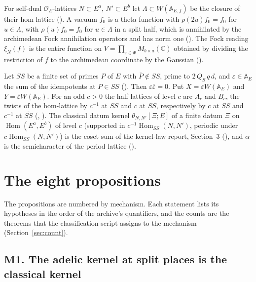 \documentclass[11pt]{article}
\newcommand{\OEr}{\mathcal O_E}
\newcommand{\A}{\mathbb A}
\newcommand{\Hom}{\operatorname{Hom}}
\theoremstyle{remark}
\begin{document}
For self-dual $\OEr$-lattices $N\subset E^a$, $N'\subset E^b$ let $\Lambda\subset W(\A_{E,f})$ be the closure of their hom-lattice (). A vacuum $f_0$ is a theta function with $\rho(2u)f_0=f_0$ for $u\in\Lambda$, with $\rho(u)f_0=f_0$ for $u\in\Lambda$ in a split half, which is annihilated by the archimedean Fock annihilation operators and has norm one (). The Fock reading $\xi_N(f)$ is the entire function on $V=\prod_{\tau\in\Phi}M_{b\times a}(\mathbb C)$ obtained by dividing the restriction of $f$ to the archimedean coordinate by the Gaussian ().

Let $SS$ be a finite set of primes $P$ of $E$ with $\bar P\notin SS$, prime to $2\,Q_S\,q\,d$, and $\varepsilon\in\A_E$ the sum of the idempotents at $P\in SS$ (). Then $\varepsilon\bar\varepsilon=0$. Put $X=\varepsilon W(\A_E)$ and $Y=\bar\varepsilon W(\A_E)$. For an odd $c>0$ the half lattices of level $c$ are $A_c$ and $B_c$, the twists of the hom-lattice by $c^{-1}$ at $SS$ and $c$ at $\overline{SS}$, respectively by $c$ at $SS$ and $c^{-1}$ at $\overline{SS}$ (, ). The classical datum kernel $\theta_{N,N'}[\Xi;E]$ of a finite datum $\Xi$ on $\Hom(E^a,E^b)$ of level $c$ (supported in $c^{-1}\Hom_{SS}(N,N')$, periodic under $c\Hom_{SS}(N,N')$) is the coset sum of the kernel-law report, Section~3 (), and $\alpha$ is the semicharacter of the period lattice ().

\section{The eight propositions}\label{sec:props}

The propositions are numbered by mechanism. Each statement lists its hypotheses in the order of the archive's quantifiers, and the counts are the theorems that the classification script assigns to the mechanism (Section~\ref{sec:count}).

\subsection{M1. The adelic kernel at split places is the classical kernel}
\end{document}
